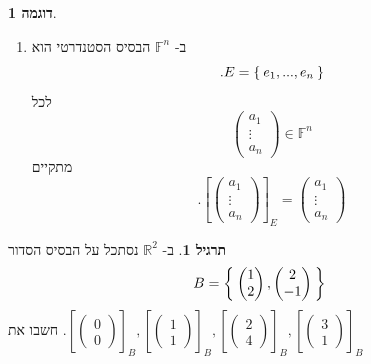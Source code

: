 \documentclass[12pt]{report}
\theoremstyle{plain}
\theoremstyle{definition}
\newtheorem{example}{דוגמה}[chapter]
\newtheorem{exercise}{תרגיל}[chapter]
\newcommand{\R}{\mathbb{R}}
\newcommand{\F}{\mathbb{F}}
\newcommand{\0}{\mathbf{0}}
\begin{document}
\begin{example}
\begin{enumerate}[label=\alph*.]
$$$$
השוויון השני נובע מהשוויון הבא:
$$
.\begin{pmatrix}
a & b \\
c & d
\end{pmatrix}=a\begin{pmatrix}
1 & 0 \\
0 & 0
\end{pmatrix}+c\begin{pmatrix}
0 & 0 \\
1 & 0
\end{pmatrix}+b\begin{pmatrix}
0 & 1 \\
0 & 0
\end{pmatrix}+d\begin{pmatrix}
0 & 0 \\
0 & 1
\end{pmatrix}
$$


\item 
ב-
$\F^n$
הבסיס הסטנדרטי הוא 
$$
.E=\Set{e_1,...,e_n}
$$
לכל
$$
\begin{pmatrix}
a_1 \\
\vdots \\
a_n
\end{pmatrix}\in\F^n
$$
מתקיים
$$
.\left[\begin{pmatrix}
a_1 \\
\vdots \\
a_n
\end{pmatrix}\right]_E=\begin{pmatrix}
a_1 \\
\vdots \\
a_n
\end{pmatrix}
$$


\end{enumerate}
\end{example}


\begin{exercise}
ב-
$\R^2$
נסתכל על הבסיס הסדור
$$
B=\Set{\begin{pmatrix}
1 \\
2
\end{pmatrix},\begin{pmatrix}
2 \\
-1
\end{pmatrix}}
$$
חשבו את
$
.\left[\begin{pmatrix}
0 \\
0
\end{pmatrix}\right]_B,\left[\begin{pmatrix}
1 \\
1
\end{pmatrix}\right]_B,\left[\begin{pmatrix}
2 \\
4
\end{pmatrix}\right]_B,\left[\begin{pmatrix}
3 \\
1
\end{pmatrix}\right]_B
$
\end{exercise}
\end{document}
